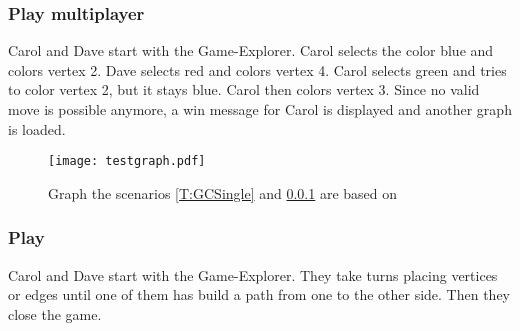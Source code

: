 \subsubsection{Play \graphcoloring multiplayer} \label{T:GCMulti}

Carol and Dave start \graphcoloring with the Game-Explorer. Carol selects the color blue and colors vertex 2. Dave selects red and colors vertex 4. Carol selects green and tries to color vertex 2, but it stays blue. Carol then colors vertex 3. Since no valid move is possible anymore, a win message for Carol is displayed and another graph is loaded.

\begin{figure}[h!]
	\centering
	\texttt{[image: testgraph.pdf]}
	\caption{Graph the scenarios \ref{T:GCSingle} and \ref{T:GCMulti} are based on}
	\label{img:ACTDEV}
\end{figure}

\subsubsection{Play \twixt}

Carol and Dave start \twixt with the Game-Explorer. They take turns placing vertices or edges until one of them has build a path from one to the other side. Then they close the game.
